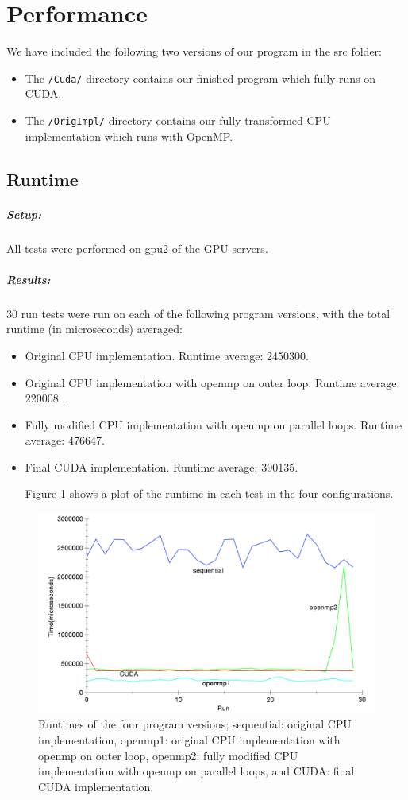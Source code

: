 \section{Performance}
We have included the following two versions of our program in the src folder:
\begin{itemize}
\item The \verb!/Cuda/! directory contains our finished program which fully runs on CUDA.
\item The \verb!/OrigImpl/! directory contains our fully transformed CPU implementation which runs with OpenMP.
\end{itemize}
\subsection{Runtime}
\subparagraph{Setup:} All tests were performed on gpu2 of the GPU servers.


\subparagraph{Results:}

30 run tests were run on each of the following program versions, with the total runtime (in microseconds) averaged:
\begin{itemize}
\item Original CPU implementation. Runtime average: 2450300.
\item Original CPU implementation with openmp on outer loop. Runtime average: 220008 .
\item Fully modified CPU implementation with openmp on parallel loops. Runtime average: 476647.
\item Final CUDA implementation. Runtime average: 390135.

Figure \ref{fig_res} shows a plot of the runtime in each test in the four configurations.
\end{itemize}
\begin{figure}[H]
\includegraphics[width=150mm]{results_plot} 
\caption{Runtimes of the four program versions; sequential: original CPU implementation, openmp1: original CPU implementation with openmp on outer loop, openmp2: fully modified CPU implementation with openmp on parallel loops, and CUDA: final CUDA implementation.}
\label{fig_res}
\end{figure}



